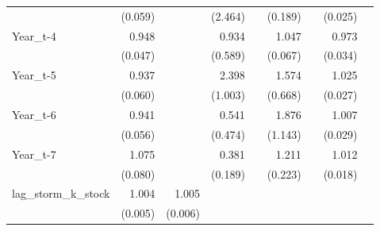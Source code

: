 \begin{table}[htbp]
\begin{tabular}{l*{8}{D{.}{.}{-1}}}
                    &     (0.059)         &                     &     (2.464)         &                     &     (0.189)         &                     &     (0.025)         &                     \\
Year\_t-4            &       0.948         &                     &       0.934         &                     &       1.047         &                     &       0.973         &                     \\
                    &     (0.047)         &                     &     (0.589)         &                     &     (0.067)         &                     &     (0.034)         &                     \\
Year\_t-5            &       0.937         &                     &       2.398\sym{**} &                     &       1.574         &                     &       1.025         &                     \\
                    &     (0.060)         &                     &     (1.003)         &                     &     (0.668)         &                     &     (0.027)         &                     \\
Year\_t-6            &       0.941         &                     &       0.541         &                     &       1.876         &                     &       1.007         &                     \\
                    &     (0.056)         &                     &     (0.474)         &                     &     (1.143)         &                     &     (0.029)         &                     \\
Year\_t-7            &       1.075         &                     &       0.381\sym{*}  &                     &       1.211         &                     &       1.012         &                     \\
                    &     (0.080)         &                     &     (0.189)         &                     &     (0.223)         &                     &     (0.018)         &                     \\
lag\_storm\_k\_stock   &       1.004         &       1.005         &                     &                     &                     &                     &                     &                     \\
                    &     (0.005)         &     (0.006)         &                     &                     &                     &                     &                     &                     \\

\end{tabular}
\end{table}
